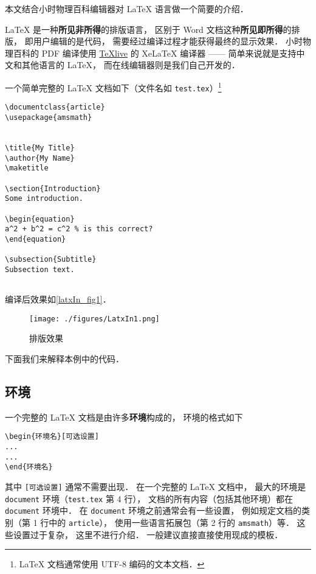 
本文结合小时物理百科编辑器对 LaTeX 语言做一个简要的介绍．

LaTeX 是一种\textbf{所见非所得}的排版语言， 区别于 Word 文档这种\textbf{所见即所得}的排版， 即用户编辑的是代码， 需要经过编译过程才能获得最终的显示效果． 小时物理百科的 PDF 编译使用 \href{https://www.tug.org/texlive/}{TeXlive} 的 XeLaTeX 编译器 —— 简单来说就是支持中文和其他语言的 LaTeX， 而在线编辑器则是我们自己开发的．

一个简单完整的 LaTeX 文档如下（文件名如 \lstinline|test.tex|）\footnote{LaTeX 文档通常使用 UTF-8 编码的文本文档．}
\begin{lstlisting}
\documentclass{article}
\usepackage{amsmath}


\title{My Title}
\author{My Name}
\maketitle

\section{Introduction}
Some introduction.

\begin{equation}
a^2 + b^2 = c^2 % is this correct?
\end{equation}

\subsection{Subtitle}
Subsection text.


\end{lstlisting}

编译后效果如\autoref{latxIn_fig1}．
\begin{figure}[ht]
\centering
\texttt{[image: ./figures/LatxIn1.png]}
\caption{排版效果} \label{latxIn_fig1}
\end{figure}
下面我们来解释本例中的代码．

\subsection{环境}
一个完整的 LaTeX 文档是由许多\textbf{环境}构成的， 环境的格式如下
\begin{lstlisting}
\begin{环境名}[可选设置]
...
...
\end{环境名}
\end{lstlisting}
其中 \lstinline|[可选设置]| 通常不需要出现． 在一个完整的 LaTeX 文档中， 最大的环境是 \lstinline|document| 环境（\lstinline|test.tex| 第 4 行）， 文档的所有内容（包括其他环境）都在 \lstinline|document| 环境中． 在 \lstinline|document| 环境之前通常会有一些设置， 例如规定文档的类别（第 1 行中的 \lstinline|article|）， 使用一些语言拓展包（第 2 行的 \lstinline|amsmath|）等． 这些设置过于复杂， 这里不进行介绍． 一般建议直接直接使用现成的模板．

